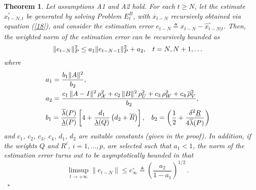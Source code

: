 \documentclass[11pt,journal,onecolumn]{IEEEtran}
\newtheorem{theorem}{Theorem}
\begin{document}
\begin{theorem}\label{theorem_1}
Let assumptions A1 and A2 hold. For each $t \ge N$, let the estimate $\hat x_{t-N,t}^\circ$ be generated by solving Problem $E^B_t$, with $\overline x_{t-N}$ recursively obtained via equation (\ref{18}), and consider the estimation error $e_{t-N} \triangleq x_{t-N} - \hat x_{t-N|t}^\circ$. Then, the weighted norm of the estimation error can be recursively bounded as
\begin{equation}\label{59}
\|e_{t-N}\|^{2}_{P}\leq a_{1}\|e_{t-N-1}\|^{2}_{P}+a_{2},\hspace{3mm}t=N,N+1,\ldots
\end{equation}
where
\begin{equation}\label{60}
\begin{split}
& a_{1}=\frac{b_{1}\|A\|^{2}}{b_{2}} , \\
& a_2 = \frac{c_1 \, \| A-I \|^2 \, \rho^2_{\mathcal X}+ c_2 \, \| B \|^2 \, \rho_U^2 +  c_3 \, \rho_W^2 + c_ 4 \, \overline{\rho}_V^2 }{b_2}, \\
&b_{1}= \frac{\overline{\lambda}(P)}{\underline{\lambda}(P)} \left[4+\frac{d_1}{\underline{\lambda}(Q)}\left(d_2+\overline{R} \right)\right],\hspace{3mm}b_{2}=\left(\frac{1}{2}+\frac{\delta^{2}\underline{R}}{4\overline{\lambda}(P)}\right) \\
\end{split}
\end{equation}
and $c_1$, $c_2$, $c_3$, $c_4$, $d_1$, $d_2$ are suitable constants (given in the proof). In addition, if the weights $Q$ and $R^{i}$, $i=1,\ldots,p$, are selected such that $a_{1}<1$, the norm of the estimation error turns out to be asymptotically bounded in that
\[
\limsup_{t \rightarrow + \infty} \|e_{t-N}\| \le e^{\circ}_{\infty}\triangleq \left ( \frac{a_{2}}{1-a_{1}} \right )^{1/2} \, .
\]
\mbox{   }\hfill $\square$
\end{theorem} \vspace{.3 cm}
\end{document}
